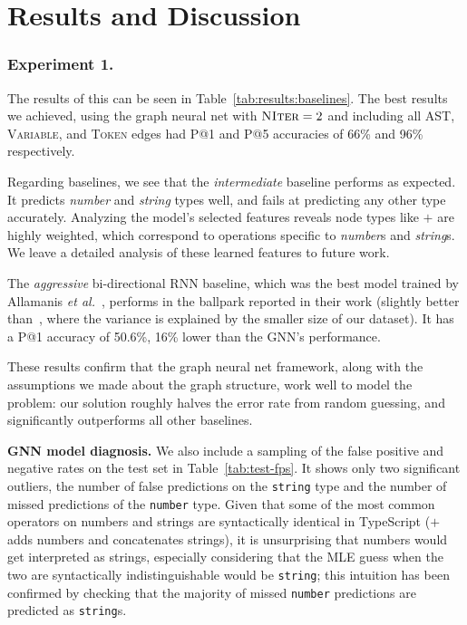 \section{Results and Discussion}
\label{sec:results}

\subsubsection{Experiment 1.}
The results of this can be seen in Table~\ref{tab:results:baselines}.
The best results we achieved, using the graph neural net with $\textsc{NIter}=2$ and including all AST, \textsc{Variable}, and \textsc{Token} edges had P@1 and P@5 accuracies of 66\% and 96\% respectively.

Regarding baselines, we see that the \textit{intermediate} baseline performs as expected.
It predicts \textit{number} and \textit{string} types well, and fails at predicting any other type accurately.
Analyzing the model's selected features reveals node types like $+$ are highly weighted, which correspond to operations specific to \textit{number}s and \textit{string}s.
We leave a detailed analysis of these learned features to future work.

The \textit{aggressive} bi-directional RNN baseline, which was the best model trained by Allamanis \textit{et al.}~\cite{hellendoorn2018deep}, performs in the ballpark reported in their work (slightly better than~\cite{hellendoorn2018deep}, where the variance is explained by the smaller size of our dataset).
It has a P@1 accuracy of 50.6\%, 16\% lower than the GNN's performance.

These results confirm that the graph neural net framework, along with the assumptions we made about the graph structure, work well to model the problem: our solution roughly halves the error rate from random guessing, and significantly outperforms all other baselines.

\textbf{GNN model diagnosis.}
We also include a sampling of the false positive and negative rates on the test set in Table~\ref{tab:test-fps}.
It shows only two significant outliers, the number of false predictions on the \texttt{string} type and the number of missed predictions of the \texttt{number} type.
Given that some of the most common operators on numbers and strings are syntactically identical in TypeScript ($+$ adds numbers and concatenates strings), it is unsurprising that numbers would get interpreted as strings, especially considering that the MLE guess when the two are syntactically indistinguishable would be \texttt{string}; this intuition has been confirmed by checking that the majority of missed \texttt{number} predictions are predicted as \texttt{string}s.


